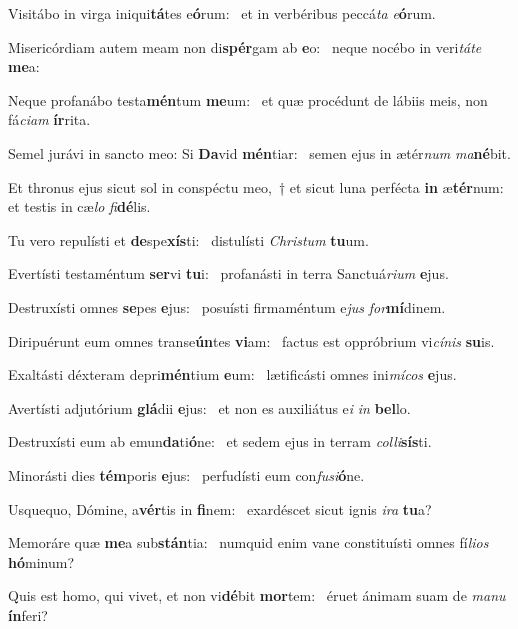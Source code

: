 \item Visitábo in virga iniqui\textbf{tá}tes e\textbf{ó}rum:~\psstar{} et in verbéribus peccá\textit{ta} \textit{e}\textbf{ó}rum.
\item Misericórdiam autem meam non di\textbf{spér}gam ab \textbf{e}o:~\psstar{} neque nocébo in veri\textit{táte} \textbf{me}a:
\item Neque profanábo testa\textbf{mén}tum \textbf{me}um:~\psstar{} et quæ procédunt de lábiis meis, non fá\textit{ciam} \textbf{ír}rita.
\item Semel jurávi in sancto meo: Si \textbf{Da}vid \textbf{mén}tiar:~\psstar{} semen ejus in ætér\textit{num} \textit{ma}\textbf{né}bit.
\item Et thronus ejus sicut sol in conspéctu meo,~† et sicut luna perfécta \textbf{in} æ\textbf{tér}num:~\psstar{} et testis in cæ\textit{lo} \textit{fi}\textbf{dé}lis.
\item Tu vero repulísti et \textbf{de}spe\textbf{xís}ti:~\psstar{} distulísti \textit{Christum} \textbf{tu}um.
\item Evertísti testaméntum \textbf{ser}vi \textbf{tu}i:~\psstar{} profanásti in terra Sanctuá\textit{rium} \textbf{e}jus.
\item Destruxísti omnes \textbf{se}pes \textbf{e}jus:~\psstar{} posuísti firmaméntum e\textit{jus} \textit{for}\textbf{mí}dinem.
\item Diripuérunt eum omnes transe\textbf{ún}tes \textbf{vi}am:~\psstar{} factus est oppróbrium vi\textit{cínis} \textbf{su}is.
\item Exaltásti déxteram depri\textbf{mén}tium \textbf{e}um:~\psstar{} lætificásti omnes ini\textit{mícos} \textbf{e}jus.
\item Avertísti adjutórium \textbf{glá}dii \textbf{e}jus:~\psstar{} et non es auxiliátus e\textit{i} \textit{in} \textbf{bel}lo.
\item Destruxísti eum ab emun\textbf{da}ti\-\textbf{ó}ne:~\psstar{} et sedem ejus in terram \textit{colli}\textbf{sís}ti.
\item Minorásti dies \textbf{tém}poris \textbf{e}jus:~\psstar{} perfudísti eum con\textit{fusi}\textbf{ó}ne.
\item Usquequo, Dómine, a\textbf{vér}tis in \textbf{fi}nem:~\psstar{} exardéscet sicut ignis \textit{ira} \textbf{tu}a?
\item Memoráre quæ \textbf{me}a sub\textbf{stán}\-tia:~\psstar{} numquid enim vane constituísti omnes fí\textit{lios} \textbf{hó}minum?
\item Quis est homo, qui vivet, et non vi\textbf{dé}bit \textbf{mor}tem:~\psstar{} éruet ánimam suam de \textit{manu} \textbf{ín}feri?
